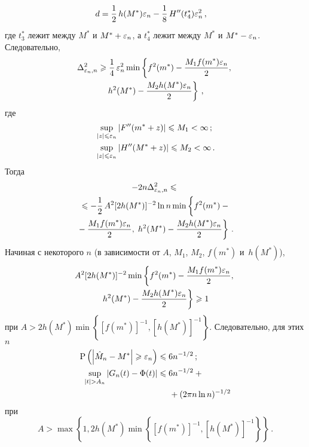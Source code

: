 \begin{multicols}{2}
\begin{align*}
d&=\displaystyle\frac{\displaystyle 1\mathstrut}{\displaystyle 2\mathstrut}\,h(M^*)\varepsilon_n-\displaystyle\frac{\displaystyle 1\mathstrut}{\displaystyle 8\mathstrut}\,H''(t_4^*)\varepsilon^2_n\,,
\end{align*}
где $t_3^*$ лежит между $M^*$ и $M^*+\varepsilon_n$, а $t_4^*$ лежит между $M^*$ и $M^*-\varepsilon_n$.
Следовательно,
\begin{multline*}
\Delta^2_{\varepsilon_n,n}\geqslant\displaystyle\frac{\displaystyle 1\mathstrut}{\displaystyle 4\mathstrut}\,\varepsilon_n^2\min\left\{f^2(m^*)-
\displaystyle\frac{\displaystyle M_1 f(m^*)\varepsilon_n\mathstrut}{\displaystyle 2\mathstrut},\right.\\
\left. h^2(M^*)-\displaystyle\frac{\displaystyle M_2 h(M^*)\varepsilon_n\mathstrut}{\displaystyle 2\mathstrut}\right\}\,,
\end{multline*}
где
\begin{align*}
&\sup\limits_{\left\vert z\right\vert\leqslant\varepsilon_n}\left\vert F''(m^*+z)\right\vert\leqslant M_1<\infty\,;\\
&\sup\limits_{\left\vert z\right\vert\leqslant\varepsilon_n}\left\vert H''(M^*+z)\right\vert\leqslant M_2<\infty\,.
\end{align*}
Тогда
\begin{multline*}
-2n\Delta^2_{\eps_n,n}\leqslant{}\\
{}\leqslant -\fr{1}{2}\,A^2[2h(M^*)]^{-2}\ln n\min\left\{
\vphantom{\fr{M_2M^*}{2}}
f^2(m^*)-{}\right.\\
{}-\fr{M_1 f(m^*)\eps_n}{2},\,
\left.h^2(M^*)-\fr{M_2 h(M^*)\eps_n}{2}\right\}\,.
\end{multline*}
Начиная с некоторого $n$ (в зависимости от $A$, $M_1$, $M_2$, $f(m^*)$ и~$h(M^*)$),
\begin{multline*}
A^2[2h(M^*)]^{-2}\min\left\{f^2(m^*)-\displaystyle\frac{\displaystyle M_1 f(m^*)\varepsilon_n\mathstrut}{\displaystyle 2\mathstrut},\right.\\
\left.h^2(M^*)-\displaystyle\frac{\displaystyle M_2 h(M^*)\varepsilon_n\mathstrut}{\displaystyle 2\mathstrut}\right\}\geqslant1
\end{multline*}
при $A>2h(M^*)\min\left\{[f(m^*)]^{-1},[h(M^*)]^{-1}\right\}$. Следовательно, для этих $n$
\begin{align}
\mbox{P}\left(\left\vert\hat{M}_n-M^*\right\vert\geqslant\varepsilon_n\right)&\leqslant6n^{-1/2}\,;\label{e9-sh}
\\
\sup\limits_{\left\vert t\right\vert>A_n}\left\vert G_n(t)-\Phi(t)\right\vert&\leqslant6n^{-1/2}+{}\notag\\
&\hspace*{5mm}{}+(2\pi n\ln n)^{-1/2}
\label{e10-sh}
\end{align}
при 
$$
A>\max\left\{1,2h(M^*)\min\left\{[f(m^*)]^{-1},[h(M^*)]^{-1}\right\}\right\}\,.
$$


\end{multicols}
